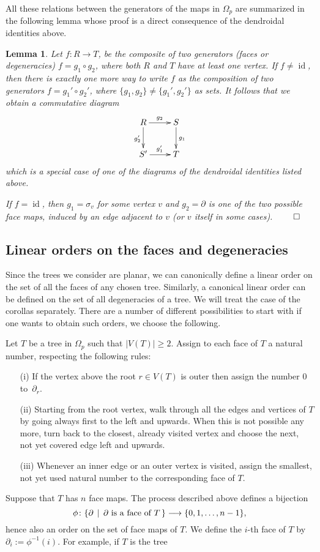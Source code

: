 \documentclass[a4paper]{amsart}
\theoremstyle{plain}
\newtheorem{lem}[thm]{Lemma}
\theoremstyle{definition}
\theoremstyle{remark}
\DeclareMathOperator{\id}{id}
\newcommand{\rpd}{\Omega_p}
\newcommand{\To}{\longrightarrow}
\numberwithin{equation}{section}
\numberwithin{figure}{section}
\begin{document}
All these relations between the generators of the maps in $\rpd$ are
summarized in the following lemma whose proof is a direct
consequence of the dendroidal identities above.
\begin{lem}\label{dendroidal identities}
    Let $f:R\To T$, be the composite of two generators (faces or degeneracies) $f=g_1\circ g_2$, where both $R$ and $T$ have at least one vertex.
    If $f\neq \id$, then there is exactly one more way to write $f$ as the composition of two generators $f=g_1'\circ g_2'$, where
    $\{g_1,g_2\}\ne\{g_1',g_2'\}$ as sets.  It follows that we obtain a commutative diagram
    $$
        \xymatrix{R\ar[r]^{g_2}\ar[d]_{g_2'} &S\ar[d]^{g_1}\\
            S'\ar[r]^{g_1'} &T}
    $$
    which is a special case of one of the diagrams of the dendroidal identities listed above.

    If $f=\id$, then $g_1=\sigma_v$ for some vertex $v$ and $g_2=\partial$ is one of the two possible face maps, induced
    by an edge adjacent to $v$ (or $v$ itself in some cases).  $\hfill\qed$
\end{lem}

\subsection{Linear orders on the faces and degeneracies}
\label{generorders}
Since the trees we consider are planar, we can canonically define a linear order on the set of all the faces of any chosen tree.
Similarly, a canonical linear order can be defined on the set of all degeneracies of a tree. We will treat the case of the
corollas separately.
There are a number of different possibilities to start with if one wants to obtain such orders, we choose the following.

Let $T$ be a tree in $\rpd$ such that $|V(T)|\ge 2$. Assign to each face of $T$ a natural number, respecting the following rules:
\begin{itemize}
    \item[{\rm (i)}] If the vertex above the root $r\in V(T)$ is outer then assign the number 0 to~$\partial_r$.
    \item[{\rm (ii)}] Starting from the root vertex, walk through all the edges and  vertices of $T$ by going always first to the left and upwards. When this is not possible any more, turn back to the closest, already visited vertex and choose the next, not yet covered edge left and upwards.
    \item[{\rm (iii)}] Whenever an inner edge or an outer vertex is visited, assign the smallest, not yet used natural number to the corresponding face of $T$.
\end{itemize}
Suppose that $T$ has $n$ face maps. The process described above defines a bijection
$$
    \phi\colon \{\partial\,\mid\, \partial \textnormal{ is a face of $T$}\,\}\To \{0,1,\ldots,n-1\},
$$
hence also an order on the set of face maps of $T$. We define the $i$-th face of $T$ by $\partial_i:=\phi^{-1}(i)$.
For example, if $T$ is the tree
\end{document}
